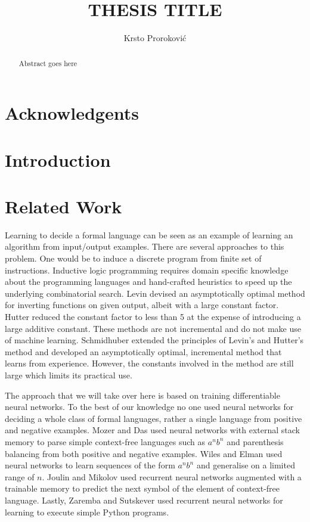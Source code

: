 \documentclass[titlepage]{report}
\title{THESIS TITLE}
\author{Krsto Proroković}
\makeatletter
\newcommand{\RemoveAlgoNumber}{\renewcommand{\fnum@algocf}{\AlCapSty{\AlCapFnt\algorithmcfname}}}
\makeatother
\begin{document}
\maketitle
\RemoveAlgoNumber

\begin{abstract}
Abstract goes here
\end{abstract}

\chapter*{Acknowledgents}

\tableofcontents

\chapter{Introduction}

\chapter{Related Work}

Learning to decide a formal language can be seen as an example of learning an algorithm from input/output examples. There are several approaches to this problem. One would be to induce a discrete program from finite set of instructions. Inductive logic programming \cite{muggleton1991inductive} requires domain specific knowledge about the programming languages and hand-crafted heuristics to speed up the underlying combinatorial search. Levin \cite{levin1973universal} devised an asymptotically optimal method for inverting functions on given output, albeit with a large constant factor. Hutter \cite{hutter2002fastest} reduced the constant factor to less than 5 at the expense of introducing a large additive constant. These methods are not incremental and do not make use of machine learning. Schmidhuber \cite{schmidhuber2004optimal} extended the principles of Levin's and Hutter's method and developed an asymptotically optimal, incremental method that learns from experience. However, the constants involved in the method are still large which limits its practical use.

The approach that we will take over here is based on training differentiable neural networks. To the best of our knowledge no one used neural networks for deciding a whole class of formal languages, rather a single language from positive and negative examples. Mozer and Das \cite{mozer1993connectionist} used neural networks with external stack memory to parse simple context-free languages such as $a^n b^n$ and parenthesis balancing from both positive and negative examples. Wiles and Elman \cite{wiles1995learning} used neural networks to learn sequences of the form $a^n b^n$ and generalise on a limited range of $n$. Joulin and Mikolov \cite{joulin2015inferring} used recurrent neural networks augmented with a trainable memory to predict the next symbol of the element of context-free language. Lastly, Zaremba and Sutskever \cite{zaremba2014learning} used recurrent neural networks for learning to execute simple Python programs.
\end{document}

